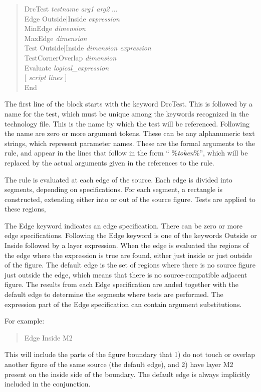 \begin{quote}
{\vt DrcTest} {\it testname arg1 arg2} ...\\
{\vt Edge Outside|Inside} {\it expression}\\
{\vt MinEdge} {\it dimension}\\
{\vt MaxEdge} {\it dimension}\\
{\vt Test Outside|Inside} {\it dimension expression}\\
{\vt TestCornerOverlap} {\it dimension}\\
{\vt Evaluate} {\it logical\_expression}\\
{\vt [} {\it script lines} {\vt ]}\\
{\vt End}
\end{quote}

The first line of the block starts with the keyword {\et DrcTest}. 
This is followed by a name for the test, which must be unique among
the keywords recognized in the technology file.  This is the name by
which the test will be referenced.  Following the name are zero or
more argument tokens.  These can be any alphanumeric text strings,
which represent parameter names.  These are the formal arguments to
the rule, and appear in the lines that follow in the form ``{\vt
\%}{\it token}{\vt \%}'', which will be replaced by the actual arguments
given in the references to the rule.

The rule is evaluated at each edge of the source.  Each edge is
divided into segments, depending on specifications.  For each segment,
a rectangle is constructed, extending either into or out of the
source figure.  Tests are applied to these regions,

The {\et Edge} keyword indicates an edge specification.  There can be
zero or more edge specifications.  Following the {\et Edge} keyword is
one of the keywords {\et Outside} or {\et Inside} followed by a layer
expression.  When the edge is evaluated the regions of the edge where
the expression is true are found, either just inside or just outside
of the figure.  The default edge is the set of regions where there is
no source figure just outside the edge, which means that there is no
source-compatible adjacent figure.  The results from each {\et Edge}
specification are anded together with the default edge to determine
the segments where tests are performed.  The expression part of the
{\et Edge} specification can contain argument substitutions.

For example:
\begin{quote}\vt
Edge Inside M2
\end{quote}
This will include the parts of the figure boundary that 1) do not
touch or overlap another figure of the same source (the default edge),
and 2) have layer {\vt M2} present on the inside side of the boundary. 
The default edge is always implicitly included in the conjunction.

